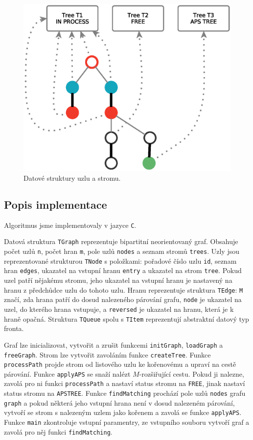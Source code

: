 \documentclass[a4paper, 11pt, titlepage, final]{article}[3. prosinec 2011]
\begin{document}
\begin{figure}[ht]
  \centering
  \includegraphics[scale=0.5]{img/implementation.eps}
  \caption{Datové struktury uzlu a stromu.}
  \label{imgStructure}
\end{figure}

\subsection{Popis implementace}

Algoritmus jsme implementovaly v jazyce \texttt{C}.

Datová struktura \texttt{TGraph} reprezentuje bipartitní neorientovaný graf. Obsahuje počet uzlů \texttt{n}, počet hran \texttt{m}, pole uzlů \texttt{nodes} a seznam stromů \texttt{trees}. Uzly jsou reprezentované strukturou \texttt{TNode} s položkami: pořadové číslo uzlu \texttt{id}, seznam hran \texttt{edges}, ukazatel na vstupní hranu \texttt{entry} a ukazatel na strom \texttt{tree}. Pokud uzel patří nějakému stromu, jeho ukazatel na vstupní hranu je nastavený na hranu z předchůdce uzlu do tohoto uzlu. Hranu reprezentuje struktura \texttt{TEdge}: \texttt{M} značí, zda hrana patří do dosud nalezeného párování grafu, \texttt{node} je ukazatel na uzel, do kterého hrana vstupuje, a \texttt{reversed} je ukazatel na hranu, která je k hraně opačná. Struktura \texttt{TQueue} spolu s \texttt{TItem} reprezentují abstraktní datový typ fronta.

Graf lze inicializovat, vytvořit a zrušit funkcemi \texttt{initGraph}, \texttt{loadGraph} a \texttt{freeGraph}. Strom lze vytvořit zavoláním funkce \texttt{createTree}. Funkce \texttt{processPath} projde strom od listového uzlu ke kořenovému a upraví na cestě párování. Funkce \texttt{applyAPS} se snaží nalézt $M$-rozšiřující cestu. Pokud ji nalezne, zavolá pro ni funkci \texttt{processPath} a nastaví status stromu na \texttt{FREE}, jinak nastaví status stromu na \texttt{APSTREE}. Funkce \texttt{findMatching} prochází pole uzlů \texttt{nodes} grafu \texttt{graph} a pokud některá jeho vstupní hrana není v dosud nalezeném párování, vytvoří se strom s nalezeným uzlem jako kořenem a zavolá se funkce \texttt{applyAPS}. Funkce \texttt{main} zkontroluje vstupní paramentry, ze vstupního souboru vytvoří graf a zavolá pro něj funkci \texttt{findMatching}.
\end{document}
